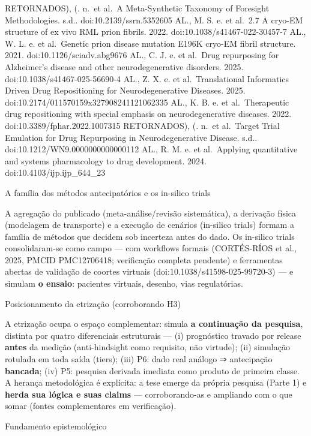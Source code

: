 \documentclass[12pt,a4paper,oneside]{report}
\begin{document}
RETORNADOS), (. n.~et al.~A Meta-Synthetic Taxonomy of Foresight
Methodologies. s.d.. doi:10.2139/ssrn.5352605 \cite{e50} AL., M. S. e.
et al.~2.7 A cryo-EM structure of ex vivo RML prion fibrils. 2022.
doi:10.1038/s41467-022-30457-7 \cite{e51} AL., W. L. e. et al.~Genetic
prion disease mutation E196K cryo-EM fibril structure. 2021.
doi:10.1126/sciadv.abg9676 \cite{e52} AL., C. J. e. et al.~Drug
repurposing for Alzheimer's disease and other neurodegenerative
disorders. 2025. doi:10.1038/s41467-025-56690-4 \cite{e53} AL., Z. X. e.
et al.~Translational Informatics Driven Drug Repositioning for
Neurodegenerative Diseases. 2025.
doi:10.2174/011570159x327908241121062335 \cite{e54} AL., K. B. e. et
al.~Therapeutic drug repositioning with special emphasis on
neurodegenerative diseases. 2022. doi:10.3389/fphar.2022.1007315
\cite{e55} RETORNADOS), (. n.~et al.~Target Trial Emulation for Drug
Repurposing in Neurodegenerative Disease. s.d..
doi:10.1212/WN9.0000000000000112 \cite{e56} AL., R. M. e. et
al.~Applying quantitative and systems pharmacology to drug development.
2024. doi:10.4103/ijp.ijp\_644\_23

A família dos métodos antecipatórios e os in-silico trials

A agregação do publicado (meta-análise/revisão sistemática), a derivação
física (modelagem de transporte) e a execução de cenários (in-silico
trials) formam a família de métodos que decidem sob incerteza antes do
dado. Os in-silico trials consolidaram-se como campo --- com workflows
formais (CORTÉS-RÍOS et al., 2025, PMCID PMC12706418; verificação
completa pendente) e ferramentas abertas de validação de coortes
virtuais (doi:10.1038/s41598-025-99720-3) --- e simulam \textbf{o
ensaio}: pacientes virtuais, desenho, vias regulatórias.

Posicionamento da etrização (corroborando H3)

A etrização ocupa o espaço complementar: simula \textbf{a continuação da
pesquisa}, distinta por quatro diferenciais estruturais --- (i)
prognóstico travado por release \textbf{antes} da medição
(anti-hindsight como requisito, não virtude); (ii) simulação rotulada em
toda saída (tiers); (iii) P6: dado real análogo ⇒ antecipação
\textbf{bancada}; (iv) P5: pesquisa derivada imediata como produto de
primeira classe. A herança metodológica é explícita: a tese emerge da
própria pesquisa (Parte 1) e \textbf{herda sua lógica e suas claims} ---
corroborando-as e ampliando com o que somar (fontes complementares em
verificação).

Fundamento epistemológico
\end{document}

